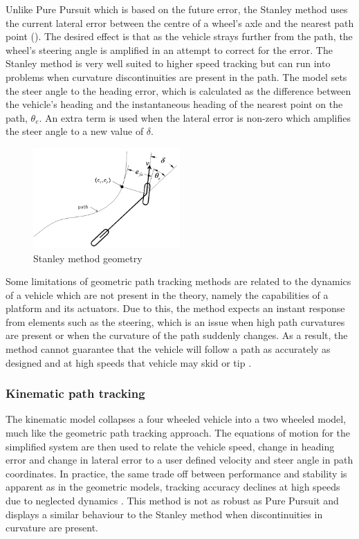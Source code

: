 \documentclass[main.tex]{subfiles}
\begin{document}
Unlike Pure Pursuit which is based on the future error, the Stanley method uses the current lateral error between the centre of a wheel's axle and the nearest path point (). The desired effect is that as the vehicle strays further from the path, the wheel's steering angle is amplified in an attempt to correct for the error. The Stanley method is very well suited to higher speed tracking but can run into problems when curvature discontinuities are present in the path. The model sets the steer angle to the heading error, which is calculated as the difference between the vehicle's heading and the instantaneous heading of the nearest point on the path, $\theta_e$. An extra term is used when the lateral error is non-zero which amplifies the steer angle to a new value of $\delta$.
\begin{figure}[ht]
\includegraphics[width=0.5\textwidth]{2-LiteratureReview/stanleyMethod.png}
\centering
\caption[Stanley method geometry]{Stanley method geometry \parencite{snider2009}} 
\end{figure}


Some limitations of geometric path tracking methods are related to the dynamics of a vehicle which are not present in the theory, namely the capabilities of a platform and its actuators. Due to this, the method expects an instant response from elements such as the steering, which is an issue when high path curvatures are present or when the curvature of the path suddenly changes. As a result, the method cannot guarantee that the vehicle will follow a path as accurately as designed and at high speeds that vehicle may skid or tip \parencite{coulter1992}.

\subsubsection{Kinematic path tracking}
The kinematic model collapses a four wheeled vehicle into a two wheeled model, much like the geometric path tracking approach. The equations of motion for the simplified system are then used to relate the vehicle speed, change in heading error and change in lateral error to a user defined velocity and steer angle in path coordinates. In practice, the same trade off between performance and stability is apparent as in the geometric models, tracking accuracy declines at high speeds due to neglected dynamics \parencite{snider2009}. This method is not as robust as Pure Pursuit and displays a similar behaviour to the Stanley method when discontinuities in curvature are present.
\end{document}

